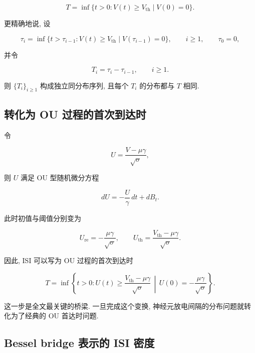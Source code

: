 \documentclass[oneside]{ctexart}
\begin{document}
\begin{equation}
    T=\inf\{t>0:V(t)\geq V_{\mathrm{th}} \mid V(0)=0\}.
\end{equation}

更精确地说, 设

\begin{equation}
    \tau_i=\inf\{t>\tau_{i-1}:V(t)\geq V_{\mathrm{th}} \mid V(\tau_{i-1})=0\}, \qquad i\geq 1, \qquad \tau_0=0,
\end{equation}

并令

\begin{equation}
    T_i=\tau_i-\tau_{i-1}, \qquad i\geq 1.
\end{equation}

则 $\{T_i\}_{i\geq 1}$ 构成独立同分布序列, 且每个 $T_i$ 的分布都与 $T$ 相同.

\subsection{转化为 OU 过程的首次到达时}

令

\begin{equation}
    U=\dfrac{V-\mu\gamma}{\sqrt{\sigma}},
\end{equation}

则 $U$ 满足 OU 型随机微分方程

\begin{equation}
    dU=-\dfrac{U}{\gamma}\,dt+dB_t.
\end{equation}

此时初值与阈值分别变为

\begin{equation}
    U_{\mathrm{re}}=-\dfrac{\mu\gamma}{\sqrt{\sigma}}, \qquad U_{\mathrm{th}}=\dfrac{V_{\mathrm{th}}-\mu\gamma}{\sqrt{\sigma}}.
\end{equation}

因此, ISI 可以写为 OU 过程的首次到达时

\begin{equation}
    T=\inf\left\{t>0:U(t)\geq \dfrac{V_{\mathrm{th}}-\mu\gamma}{\sqrt{\sigma}} \,\middle|\, U(0)=-\dfrac{\mu\gamma}{\sqrt{\sigma}}\right\}.
\end{equation}

这一步是全文最关键的桥梁. 一旦完成这个变换, 神经元放电间隔的分布问题就转化为了经典的 OU 首达时问题.

\subsection{Bessel bridge 表示的 ISI 密度}
\end{document}
